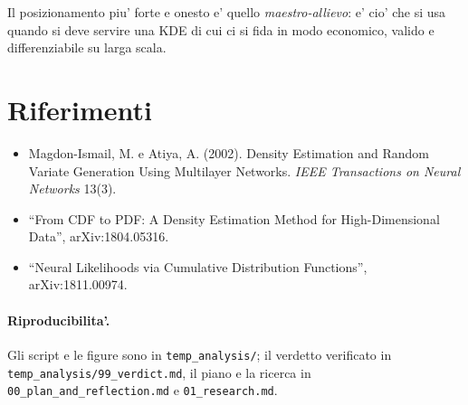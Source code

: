\documentclass[11pt]{article}
\begin{document}
Il posizionamento piu' forte e onesto e' quello \emph{maestro-allievo}: e' cio' che si usa quando si
deve servire una KDE di cui ci si fida in modo economico, valido e differenziabile su larga scala.

\section*{Riferimenti}
\begin{itemize}\setlength{\itemsep}{0pt}
  \item Magdon-Ismail, M. e Atiya, A. (2002). Density Estimation and Random Variate Generation Using
  Multilayer Networks. \emph{IEEE Transactions on Neural Networks} 13(3).
  \item ``From CDF to PDF: A Density Estimation Method for High-Dimensional Data'', arXiv:1804.05316.
  \item ``Neural Likelihoods via Cumulative Distribution Functions'', arXiv:1811.00974.
\end{itemize}

\paragraph{Riproducibilita'.} Gli script e le figure sono in \texttt{temp\_analysis/}; il verdetto
verificato in \texttt{temp\_analysis/99\_verdict.md}, il piano e la ricerca in
\texttt{00\_plan\_and\_reflection.md} e \texttt{01\_research.md}.
\end{document}
